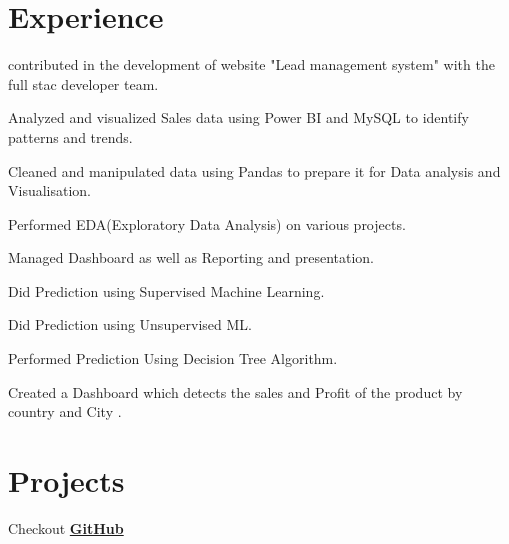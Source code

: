 \documentclass[]{Pratyush-resume-openfont}
\begin{document}
\begin{minipage}[t]{0.66\textwidth} 


\section{Experience}
\sectionsep
{}
\vspace{\topsep}
\begin{tightemize}
\item contributed in the development of website "Lead management system" with the full stac developer team.
\item Analyzed and visualized Sales data using Power BI and MySQL to identify patterns and trends. 
\item Cleaned and manipulated data using Pandas to prepare it for Data analysis and Visualisation.
\item Performed EDA(Exploratory Data Analysis) on various projects. 
\item Managed Dashboard as well as Reporting and presentation.
\end{tightemize}
\sectionsep





\begin{tightemize}
\item Did Prediction using Supervised Machine Learning.
\item Did Prediction using Unsupervised ML.
\item Performed Prediction Using Decision Tree Algorithm.
\item Created a Dashboard which detects the sales and Profit of the product by country and City .
\end{tightemize}
\sectionsep

\section{Projects}
Checkout \textbf{\href{https://github.com/PratyushSingh1}{GitHub}} 
\sectionsep


\end{minipage}
\end{document}
